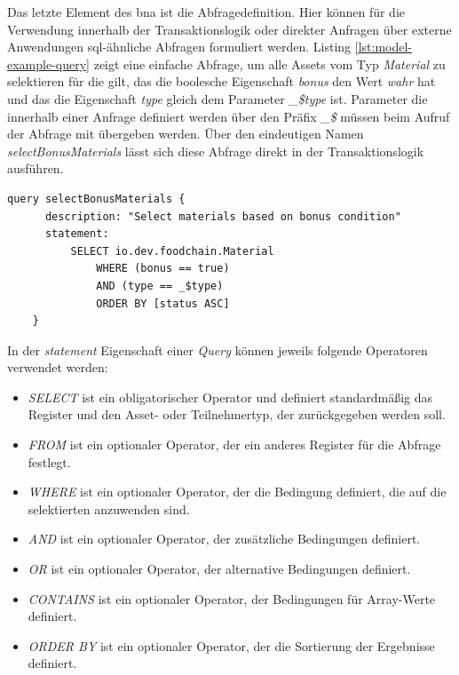 \noindent
Das letzte Element des \acf{bna} ist die Abfragedefinition. Hier können für die Verwendung innerhalb der Transaktionslogik oder direkter Anfragen über externe Anwendungen \acs{sql}-ähnliche Abfragen formuliert werden. Listing \ref{lst:model-example-query} zeigt eine einfache Abfrage, um alle Assets vom Typ \textit{Material} zu selektieren für die gilt, das die boolesche Eigenschaft \textit{bonus} den Wert \textit{wahr} hat und das die Eigenschaft \textit{type} gleich dem Parameter \textit{\_\$type} ist. Parameter die innerhalb einer Anfrage definiert werden über den Präfix \textit{\_\$} müssen beim Aufruf der Abfrage mit übergeben werden. Über den eindeutigen Namen \textit{selectBonusMaterials} lässt sich diese Abfrage direkt in der Transaktionslogik ausführen.

\begin{lstlisting}[caption={Abfragedefinition},label=lst:model-example-query]
    query selectBonusMaterials {
      description: "Select materials based on bonus condition"
      statement:
          SELECT io.dev.foodchain.Material
              WHERE (bonus == true)
              AND (type == _$type)
              ORDER BY [status ASC]
    }
\end{lstlisting}

\noindent
In der \textit{statement} Eigenschaft einer \textit{Query} können jeweils folgende Operatoren verwendet werden:

\begin{itemize}
    \item \textit{SELECT} ist ein obligatorischer Operator und definiert standardmäßig das Register und den Asset- oder Teilnehmertyp, der zurückgegeben werden soll.
    \item \textit{FROM} ist ein optionaler Operator, der ein anderes Register für die Abfrage festlegt.
    \item \textit{WHERE} ist ein optionaler Operator, der die Bedingung definiert, die auf die selektierten anzuwenden sind.
    \item \textit{AND} ist ein optionaler Operator, der zusätzliche Bedingungen definiert.
    \item \textit{OR} ist ein optionaler Operator, der alternative Bedingungen definiert.
    \item \textit{CONTAINS} ist ein optionaler Operator, der Bedingungen für Array-Werte definiert.
    \item \textit{ORDER BY} ist ein optionaler Operator, der die Sortierung der Ergebnisse definiert.
\end{itemize}

